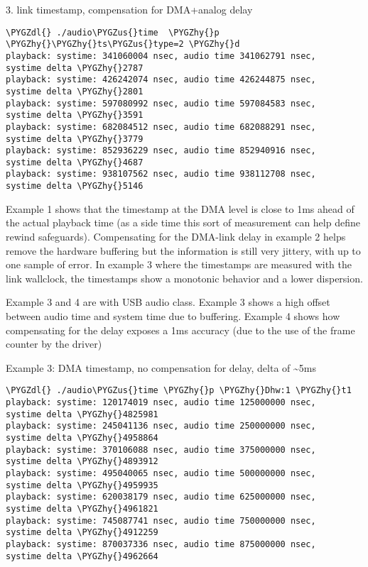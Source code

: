 \documentclass[a4paper,8pt,english]{sphinxmanual}
\def\PYGZus{\char`\_}
\def\PYGZdl{\char`\$}
\def\PYGZhy{\char`\-}
\begin{document}
3. link timestamp, compensation for DMA+analog delay

\begin{Verbatim}[commandchars=\\\{\}]
\PYGZdl{} ./audio\PYGZus{}time  \PYGZhy{}p \PYGZhy{}\PYGZhy{}ts\PYGZus{}type=2 \PYGZhy{}d
playback: systime: 341060004 nsec, audio time 341062791 nsec,         systime delta \PYGZhy{}2787
playback: systime: 426242074 nsec, audio time 426244875 nsec,         systime delta \PYGZhy{}2801
playback: systime: 597080992 nsec, audio time 597084583 nsec,         systime delta \PYGZhy{}3591
playback: systime: 682084512 nsec, audio time 682088291 nsec,         systime delta \PYGZhy{}3779
playback: systime: 852936229 nsec, audio time 852940916 nsec,         systime delta \PYGZhy{}4687
playback: systime: 938107562 nsec, audio time 938112708 nsec,         systime delta \PYGZhy{}5146
\end{Verbatim}

Example 1 shows that the timestamp at the DMA level is close to 1ms
ahead of the actual playback time (as a side time this sort of
measurement can help define rewind safeguards). Compensating for the
DMA-link delay in example 2 helps remove the hardware buffering but
the information is still very jittery, with up to one sample of
error. In example 3 where the timestamps are measured with the link
wallclock, the timestamps show a monotonic behavior and a lower
dispersion.

Example 3 and 4 are with USB audio class. Example 3 shows a high
offset between audio time and system time due to buffering. Example 4
shows how compensating for the delay exposes a 1ms accuracy (due to
the use of the frame counter by the driver)

Example 3: DMA timestamp, no compensation for delay, delta of \textasciitilde{}5ms

\begin{Verbatim}[commandchars=\\\{\}]
\PYGZdl{} ./audio\PYGZus{}time \PYGZhy{}p \PYGZhy{}Dhw:1 \PYGZhy{}t1
playback: systime: 120174019 nsec, audio time 125000000 nsec,         systime delta \PYGZhy{}4825981
playback: systime: 245041136 nsec, audio time 250000000 nsec,         systime delta \PYGZhy{}4958864
playback: systime: 370106088 nsec, audio time 375000000 nsec,         systime delta \PYGZhy{}4893912
playback: systime: 495040065 nsec, audio time 500000000 nsec,         systime delta \PYGZhy{}4959935
playback: systime: 620038179 nsec, audio time 625000000 nsec,         systime delta \PYGZhy{}4961821
playback: systime: 745087741 nsec, audio time 750000000 nsec,         systime delta \PYGZhy{}4912259
playback: systime: 870037336 nsec, audio time 875000000 nsec,         systime delta \PYGZhy{}4962664
\end{Verbatim}
\end{document}
